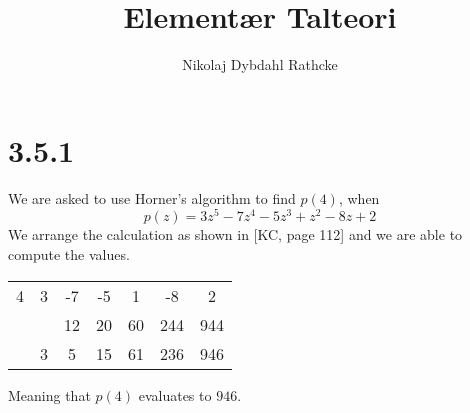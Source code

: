 \documentclass[12pt]{article}
\title{Elementær Talteori}
\author{Nikolaj Dybdahl Rathcke}
\begin{document}
\section*{3.5.1}
We are asked to use Horner's algorithm to find $p(4)$, when
$$p(z)=3z^5-7z^4-5z^3+z^2-8z+2$$
We arrange the calculation as shown in [KC, page 112] and we are able to compute the values.\\
\begin{center}
\begin{tabular}{|c|cccccc|}
\hline 
4 & 3 & -7 & -5 & 1 & -8 & 2 \\ 
 &  & 12 & 20 & 60 & 244 & 944 \\ 
\hline 
 & 3 & 5 & 15 & 61 & 236 & 946 \\ 
\hline 
\end{tabular} 
\end{center}
Meaning that $p(4)$ evaluates to $946$.
\end{document}
